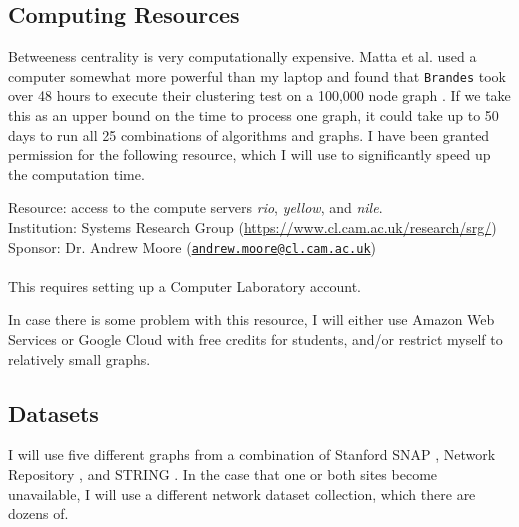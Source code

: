 \documentclass[a4paper,12pt]{article}
\newcommand{\email}[1]{\href{mailto:#1}{\nolinkurl{#1}}}
\begin{document}
\subsection*{Computing Resources} %

Betweeness centrality is very computationally expensive. Matta et al. used a computer somewhat more powerful than my laptop and found that \verb|Brandes| took over 48 hours to execute their clustering test on a 100,000 node graph \cite{comparesmall}. If we take this as an upper bound on the time to process one graph, it could take up to 50 days to run all 25 combinations of algorithms and graphs. I have been granted permission for the following resource, which I will use to significantly speed up the computation time.

{\begin{adjustwidth}{1cm}{0cm}
\noindent
Resource: access to the compute servers \textit{rio}, \textit{yellow}, and \textit{nile}.\\
Institution: Systems Research Group (\url{https://www.cl.cam.ac.uk/research/srg/})\\
Sponsor: Dr. Andrew Moore (\email{andrew.moore@cl.cam.ac.uk})\\ \\
This requires setting up a Computer Laboratory account.
\end{adjustwidth}
}

In case there is some problem with this resource, I will either use Amazon Web Services or Google Cloud with free credits for students, and/or restrict myself to relatively small graphs.
\subsection*{Datasets}
I will use five different graphs from a combination of Stanford SNAP \cite{snap}, Network Repository \cite{repository}, and STRING \cite{string}. In the case that one or both sites become unavailable, I will use a different network dataset collection, which there are dozens of.



\end{document}
